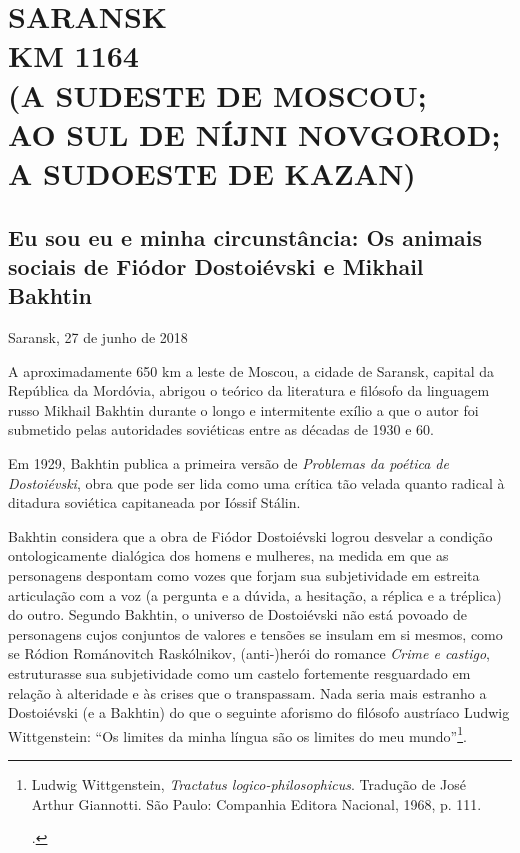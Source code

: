 \movetooddpage
{}
\part*{SARANSK\\KM 1164\\(A SUDESTE DE MOSCOU;\\AO SUL DE NÍJNI NOVGOROD;\\A SUDOESTE DE KAZAN)}

\chapter*{Eu sou eu e minha circunstância: Os animais sociais de Fiódor Dostoiévski e Mikhail Bakhtin}

\begin{flushright}
Saransk, 27 de junho de 2018
\end{flushright}

A aproximadamente 650 km a leste de Moscou, a cidade de Saransk, capital
da República da Mordóvia, abrigou o teórico da literatura e filósofo da
linguagem russo Mikhail Bakhtin durante o longo e intermitente exílio a
que o autor foi submetido pelas autoridades soviéticas entre as décadas
de 1930 e 60.

Em 1929, Bakhtin publica a primeira versão de \emph{Problemas da poética
de Dostoiévski}, obra que pode ser lida como uma crítica tão velada
quanto radical à ditadura soviética capitaneada por Ióssif Stálin.

Bakhtin considera que a obra de Fiódor Dostoiévski logrou desvelar a
condição ontologicamente dialógica dos homens e mulheres, na medida em
que as personagens despontam como vozes que forjam sua subjetividade em
estreita articulação com a voz (a pergunta e a dúvida, a hesitação, a
réplica e a tréplica) do outro. Segundo Bakhtin, o universo de
Dostoiévski não está povoado de personagens cujos conjuntos de valores e
tensões se insulam em si mesmos, como se Ródion Románovitch Raskólnikov,
(anti-)herói do romance \emph{Crime e castigo}, estruturasse sua
subjetividade como um castelo fortemente resguardado em relação à
alteridade e às crises que o transpassam. Nada seria mais estranho a
Dostoiévski (e a Bakhtin) do que o seguinte aforismo do filósofo
austríaco Ludwig Wittgenstein: ``Os limites da minha língua são os
limites do meu mundo''\footnote{Ludwig Wittgenstein, \emph{Tractatus
  logico-philosophicus}. Tradução de José Arthur Giannotti. São Paulo:
  Companhia Editora Nacional, 1968, p. 111.

  .}.

